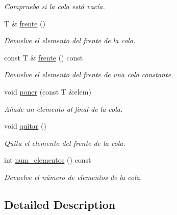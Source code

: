 \begin{DoxyCompactItemize}
\begin{DoxyCompactList}\small\item\em Comprueba si la cola está vacía. \end{DoxyCompactList}\item 
\mbox{\label{classCola_a1df4ad2b50116ef22e77ad3f77b02d29}} 
T \& \hyperlink{classCola_a1df4ad2b50116ef22e77ad3f77b02d29}{frente} ()
\begin{DoxyCompactList}\small\item\em Devuelve el elemento del frente de la cola. \end{DoxyCompactList}\item 
\mbox{\label{classCola_abd603daab25efd7131049f98ea09c175}} 
const T \& \hyperlink{classCola_abd603daab25efd7131049f98ea09c175}{frente} () const
\begin{DoxyCompactList}\small\item\em Devuelve el elemento del frente de una cola constante. \end{DoxyCompactList}\item 
void \hyperlink{classCola_a4a902e5805ae74f8d80c6f3267fd14c4}{poner} (const T \&elem)
\begin{DoxyCompactList}\small\item\em Añade un elemento al final de la cola. \end{DoxyCompactList}\item 
\mbox{\label{classCola_a320766ddc7020424052c99e5c82a105d}} 
void \hyperlink{classCola_a320766ddc7020424052c99e5c82a105d}{quitar} ()
\begin{DoxyCompactList}\small\item\em Quita el elemento del frente de la cola. \end{DoxyCompactList}\item 
\mbox{\label{classCola_a26e5b0df5411aa23114d790f0a8c023b}} 
int \hyperlink{classCola_a26e5b0df5411aa23114d790f0a8c023b}{num\+\_\+elementos} () const
\begin{DoxyCompactList}\small\item\em Devuelve el número de elementos de la cola. \end{DoxyCompactList}\end{DoxyCompactItemize}


\subsection{Detailed Description}
